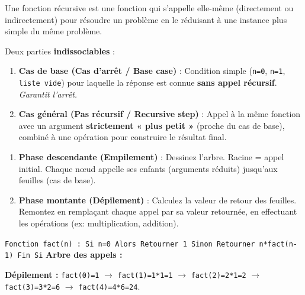 \documentclass[11pt]{article}
\newcommand{\cle}[1]{{\popxbold\color{popdark}#1}}
\newcounter{popsec}
\newcounter{popsub}
\newcommand{\courssub}[1]{%
  \stepcounter{popsub}%
  \par\vspace{9pt}\noindent{\popxbold\fontsize{11.5}{13}\selectfont\color{popink}{\color{poporange}\thepopsec.\thepopsub}\hspace{6pt}#1}\par\nopagebreak\vspace{4pt}
}
\begin{document}
\courssub{Fonctions récursives simples}

\begin{definition}[Récursivité]
Une \cle{fonction récursive} est une fonction qui s'appelle elle-même (directement ou indirectement) pour résoudre un problème en le réduisant à une instance plus simple du même problème.
\end{definition}

\begin{propriete}
Deux parties \textbf{indissociables} :
\begin{enumerate}
\item \textbf{Cas de base (Cas d'arrêt / Base case)} : Condition simple (\texttt{n=0}, \texttt{n=1}, \texttt{liste vide}) pour laquelle la réponse est connue \textbf{sans appel récursif}. \emph{Garantit l'arrêt.}
\item \textbf{Cas général (Pas récursif / Recursive step)} : Appel à la même fonction avec un argument \textbf{strictement « plus petit »} (proche du cas de base), combiné à une opération pour construire le résultat final.
\end{enumerate}
\end{propriete}

\begin{methode}
\begin{enumerate}
\item \textbf{Phase descendante (Empilement)} : Dessinez l'arbre. Racine = appel initial. Chaque nœud appelle ses enfants (arguments réduits) jusqu'aux feuilles (cas de base).
\item \textbf{Phase montante (Dépilement)} : Calculez la valeur de retour des feuilles. Remontez en remplaçant chaque appel par sa valeur retournée, en effectuant les opérations (ex: multiplication, addition).
\end{enumerate}
\end{methode}

\begin{exemplebox}
\texttt{Fonction fact(n) : Si n=0 Alors Retourner 1 Sinon Retourner n*fact(n-1) Fin Si}
\textbf{Arbre des appels :}
\begin{center}
\end{center}
\textbf{Dépilement :} \texttt{fact(0)=1} $\to$ \texttt{fact(1)=1*1=1} $\to$ \texttt{fact(2)=2*1=2} $\to$ \texttt{fact(3)=3*2=6} $\to$ \texttt{fact(4)=4*6=24}.
\end{exemplebox}
\end{document}
